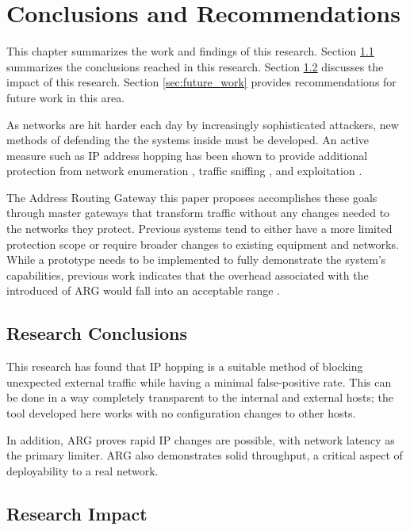 \chapter{Conclusions and Recommendations}
\label{chp:conclusion}
\par This chapter summarizes the work and findings of this research. Section \ref{sec:research_conclusions} summarizes the conclusions reached in this research. Section \ref{sec:research_impact} discusses the impact of this research. Section \ref{sec:future_work} provides recommendations for future work in this area.

\par As networks are hit harder each day by increasingly sophisticated attackers, new methods of defending the the systems inside must be developed. An active measure such as IP address hopping has been shown to provide additional protection from network enumeration \cite{NAH}, traffic sniffing \cite{BBNDYNAT}, and exploitation \cite{APOD}.

\par The Address Routing Gateway this paper proposes accomplishes these goals through master gateways that transform traffic without any changes needed to the networks they protect. Previous systems tend to either have a more limited protection scope or require broader changes to existing equipment and networks. While a prototype needs to be implemented to fully demonstrate the system's capabilities, previous work indicates that the overhead associated with the introduced of ARG would fall into an acceptable range \cite{NAH}.

\section{Research Conclusions}
\label{sec:research_conclusions}
\par This research has found that \ac{IP} hopping is a suitable method of blocking unexpected external traffic while having a minimal false-positive rate. This can be done in a way completely transparent to the internal and external hosts; the tool developed here works with no configuration changes to other hosts.

\par In addition, \ac{ARG} proves rapid \ac{IP} changes are possible, with network latency as the primary limiter. \ac{ARG} also demonstrates solid throughput, a critical aspect of deployability to a real network.

\section{Research Impact}
\label{sec:research_impact}

